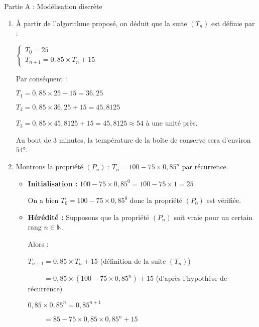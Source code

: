 \begin{corrige}
     \begin{h3}Partie A : Modélisation discrète\end{h3}
     \begin{enumerate}
          \item
          À partir de l'algorithme proposé, on déduit que la suite $(T_n)$ est définie par :
          \par
          $\begin{cases} T_0=25 \\ T_{n+1}=0,85 \times T_n+15  \end{cases}$
          \par
          Par conséquent :
          \par
          $T_1=0,85 \times  25+15=36,25$
          \par
          $T_2=0,85 \times  36,25+15=45,8125$
          \par
          $T_3=0,85 \times  45,8125+15=45,8125 \approx 54$ à une unité près.
          \par
          Au bout de 3 minutes, la température de la boîte de conserve sera d'environ $54$°.
          \item
          Montrons la propriété $(P_n)\ :\ T_n = 100-75 \times 0,85^n$ par récurrence.
          \begin{itemize}
               \item
               \textbf{Initialisation :}
               $100-75 \times 0,85^0=100-75 \times 1=25$
               \par
               On a bien $T_0 = 100-75 \times 0,85^0$ donc la propriété $(P_0)$ est vérifiée.
               \item
               \textbf{Hérédité :}
               Supposons que la propriété $(P_n)$ soit vraie pour un certain rang $n \in \mathbb{N}$.
               \par
               Alors :
               \par
               $T_{n+1}=0,85 \times T_n+15$ (définition de la suite $(T_n)$)
               \par
               $\phantom{T_{n+1}}= 0,85 \times (100-75 \times 0,85^n)+15$ (d'après l'hypothèse de récurrence)
               \begin{note}$0,85 \times 0,85^n=0,85^{n+1}$\end{note}
               $\phantom{T_{n+1}}= 85 -75 \times 0,85 \times 0,85^n+15$
               \par

\end{itemize}
\end{enumerate}
\end{corrige}
